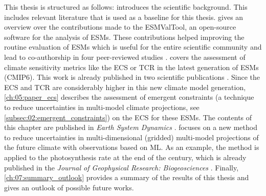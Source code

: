 This thesis is structured as follows: 
introduces the scientific background. This includes relevant literature that is
used as a baseline for this thesis.  gives an overview
over the contributions made to the \ac{ESMValTool}, an open-source software for
the analysis of \acp{ESM}. These contributions helped improving the routine
evaluation of \acp{ESM} which is useful for the entire scientific community and
lead to co-authorship in four peer-reviewed studies \autocite{Eyring2020,
  Lauer2020, Righi2020, Weigel2020}. 
covers the assessment of climate sensitivity metrics like the \ac{ECS} or
\ac{TCR} in the latest generation of \acp{ESM} (\acs{CMIP}6). This work is
already published in two scientific publications \autocite{Bock2020,
  Meehl2020}. Since the \ac{ECS} and \ac{TCR} are considerably higher in this
new climate model generation, \cref{ch:05:paper_ecs} describes the assessment
of emergent constraints (a technique to reduce uncertainties in multi-model
climate projections, see \cref{subsec:02:emergent_constraints}) on the \ac{ECS}
for these \acp{ESM}. The contents of this chapter are published in \emph{Earth
  System Dynamics} \autocite{Schlund2020a}.  focuses on a
new method to reduce uncertainties in multi-dimensional (gridded) multi-model
projections of the future climate with observations based on \ac{ML}. As an
example, the method is applied to the photosynthesis rate at the end of the
 century, which is already published in the \emph{Journal of
  Geophysical Research: Biogeosciences} \autocite{Schlund2020}. Finally,
\cref{ch:07:summary_outlook} provides a summary of the results of this thesis
and gives an outlook of possible future works.
